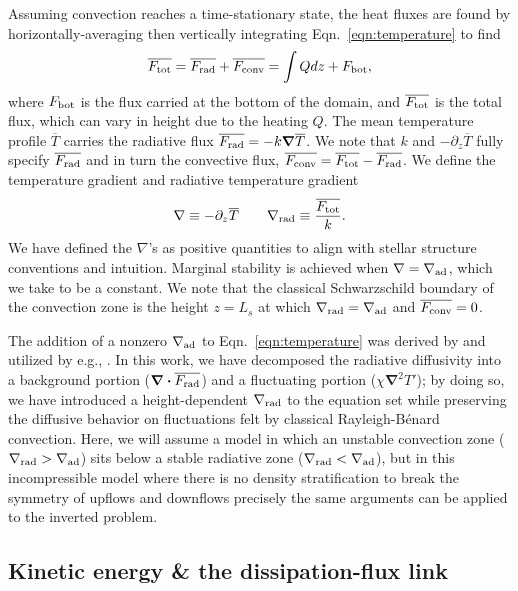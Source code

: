 \documentclass[twocolumn]{aastex631}
\newcommand{\gradrad}{\ensuremath{\nabla_{\rm{rad}}}}
\newcommand{\gradad}{\ensuremath{\nabla_{\rm{ad}}}}
\newcommand{\justgrad}{\ensuremath{\nabla}}
\newcommand{\Fbot}{\ensuremath{F_{\rm{bot}}}}
\newcommand{\Ftot}{\ensuremath{F_{\rm{tot}}}}
\newcommand{\Frad}{\ensuremath{F_{\rm{rad}}}}
\newcommand{\Fconv}{\ensuremath{F_{\rm{conv}}}}
\renewcommand{\vec}[1]{\boldsymbol{#1}}
\renewcommand{\dot}{\vec{\cdot}}
\renewcommand{\bar}[1]{\overline{#1}}
\newcommand{\grad}{\vec{\nabla}}
\begin{document}
Assuming convection reaches a time-stationary state, the heat fluxes are found by horizontally-averaging then vertically integrating Eqn.~\ref{eqn:temperature} to find
\begin{equation}
\overline{\Ftot} = \overline{\Frad} + \overline{\Fconv} = \int Q dz + \Fbot,
\label{eqn:flux_definition}
\end{equation}
where $\Fbot$ is the flux carried at the bottom of the domain, and $\overline{\Ftot}$ is the total flux, which can vary in height due to the heating $Q$.
The mean temperature profile $\overline{T}$ carries the radiative flux $\bar{\Frad} = -k \grad \overline{T}$.
We note that $k$ and $-\partial_z \bar{T}$ fully specify $\bar{\Frad}$ and in turn the convective flux, $\bar{\Fconv} = \bar{\Ftot} - \bar{\Frad}$.
We define the temperature gradient and radiative temperature gradient 
\begin{equation}
\justgrad \equiv -\partial_z \bar{T} \qquad
\gradrad \equiv \frac{\bar{\Ftot}}{k}.
\label{eqn:gradrad_definition}
\end{equation}
We have defined the $\justgrad$'s as positive quantities to align with stellar structure conventions and intuition.
Marginal stability is achieved when $\justgrad = \gradad$, which we take to be a constant.
We note that the classical Schwarzschild boundary of the convection zone is the height $z = L_s$ at which $\gradrad = \gradad$ and $\bar{\Fconv} = 0$.

The addition of a nonzero $\gradad$ to Eqn.~\ref{eqn:temperature} was derived by \citet{spiegel_veronis_1960} and utilized by e.g., \citet{korre_etal_2019}.
In this work, we have decomposed the radiative diffusivity into a background portion ($\grad\dot \bar{\Frad}$) and a fluctuating portion ($\chi \grad^2 T'$); by doing so, we have introduced a height-dependent $\gradrad$ to the equation set while preserving the diffusive behavior on fluctuations felt by classical Rayleigh-B\'{e}nard convection.
Here, we will assume a model in which an unstable convection zone ($\gradrad > \gradad$) sits below a stable radiative zone ($\gradrad < \gradad$), but in this incompressible model where there is no density stratification to break the symmetry of upflows and downflows precisely the same arguments can be applied to the inverted problem.

\subsection{Kinetic energy \& the dissipation-flux link}
\label{sec:theory_energy}
\end{document}
